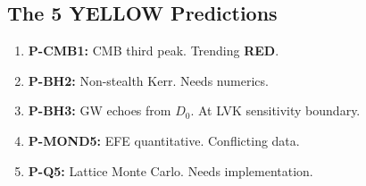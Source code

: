 \documentclass[11pt,a4paper]{article}
\newcommand{\RED}{\textcolor{dfdred}{\textbf{RED}}}
\begin{document}
\subsection{The 5 YELLOW Predictions}

\begin{enumerate}
\item \textbf{P-CMB1:} CMB third peak. Trending \RED.
\item \textbf{P-BH2:} Non-stealth Kerr. Needs numerics.
\item \textbf{P-BH3:} GW echoes from $D_0$. At LVK sensitivity boundary.
\item \textbf{P-MOND5:} EFE quantitative. Conflicting data.
\item \textbf{P-Q5:} Lattice Monte Carlo. Needs implementation.
\end{enumerate}
\end{document}
